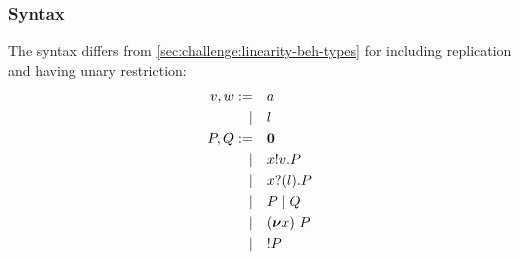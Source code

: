 \subsubsection{Syntax}
The syntax differs from \ref{sec:challenge:linearity-beh-types} for including replication and having unary restriction:
\begin{align*}
  v,w :=&&& a \\
  |&&& l \\
  P,Q :=&&& \bm{0} \\
  |&&& x ! v . P \\
  |&&& x ? (l) . P \\
  |&&& P \mid Q \\
  |&&& (\bm{\nu} x)~P \\
  |&&& {!}P
\end{align*}

